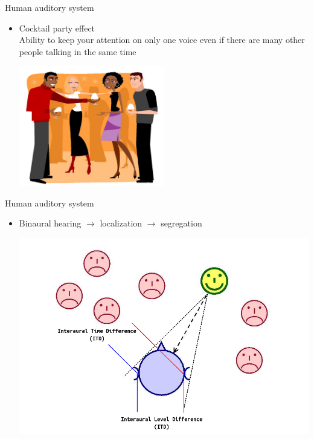 \begin{frame}[t]{Human auditory system}
\begin{itemize}
\item{Cocktail party effect}
\\Ability to keep your attention on only one voice even if there are many other people talking in the same time
\begin{center}
	\includegraphics[width=2.5in]{../pict/cocktail_party_effect}
\end{center}
\end{itemize}
\end{frame}

\begin{frame}[t]{Human auditory system}
\begin{itemize}
\item Binaural hearing $\rightarrow$ localization $\rightarrow$ segregation
\begin{center}
	\includegraphics[scale=0.2]{../pict/CPP.png}
\end{center}
\end{itemize}
\end{frame}

